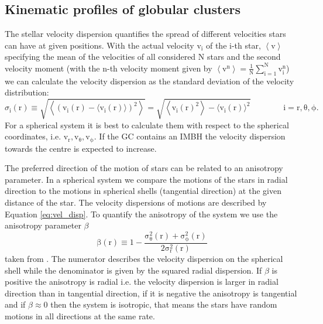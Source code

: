 \subsection{Kinematic profiles of globular clusters}\label{sec:kin_prof_theory}
\par The stellar velocity dispersion quantifies the spread of different velocities stars can have at given positions. With the actual velocity \(\mathrm{v_i}\) of the i-th star, \(\left\langle \mathrm{v}\right\rangle\) specifying the mean of the velocities of all considered N stars and the second velocity moment (with the n-th velocity moment given by
\(
\mathrm{\left\langle \mathrm{v^n}\right\rangle=\frac{1}{N}\sum_{i=1}^Nv_i^n}
\)) we can calculate the velocity dispersion as the standard deviation of the velocity distribution: 
\begin{equation}\label{eq:vel_disp}
\sigma_\mathrm{i}(\mathrm{r})\equiv\sqrt{\left\langle(\mathrm{v_i}(\mathrm{r})-\langle \mathrm{v_i}(\mathrm{r})\rangle)^2\right\rangle}=\sqrt{\left\langle \mathrm{v_i}(\mathrm{r})^2\right\rangle-\langle \mathrm{v_i}(\mathrm{r})\rangle^2} \qquad\qquad \mathrm{i=r,\theta,\phi}.
\end{equation}  For a spherical system it is best to calculate them with respect to the spherical coordinates, i.e. \(\mathrm{v_r,v_{\theta},v_{\phi}}\). If the \ac{GC} contains an \ac{IMBH} the velocity dispersion towards the centre is expected to increase. 
\par The preferred direction of the motion of stars can be related to an anisotropy parameter. In a spherical system we compare the motions of the stars in radial direction to the motions in spherical shells (tangential direction) at the given distance of the star. The velocity dispersions of motions are described by Equation \eqref{eq:vel_disp}. To quantify the anisotropy of the system we use the anisotropy parameter \(\beta\) 
\begin{equation}\label{eq:anisotropy}
\mathrm{\beta(r)\equiv1-\frac{\sigma_\theta ^2(r)+\sigma_\phi ^2(r)}{2\sigma_r ^2(r)}}
\end{equation} taken from \citet[eq. 4.61]{2008gady.book.....B}. The numerator describes the velocity dispersion on the spherical shell while the denominator is given by the squared radial dispersion. If \(\beta\) is positive the anisotropy is radial i.e. the velocity dispersion is larger in radial direction than in tangential direction, if it is negative the anisotropy is tangential and if \(\beta\approx0\) then the system is isotropic, that means the stars have random motions in all directions at the same rate. 
